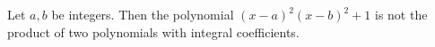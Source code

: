Let $a, b$ be integers. Then the polynomial $(x - a)^2(x - b)^2 + 1$ is not the product of two polynomials with integral coefficients.
